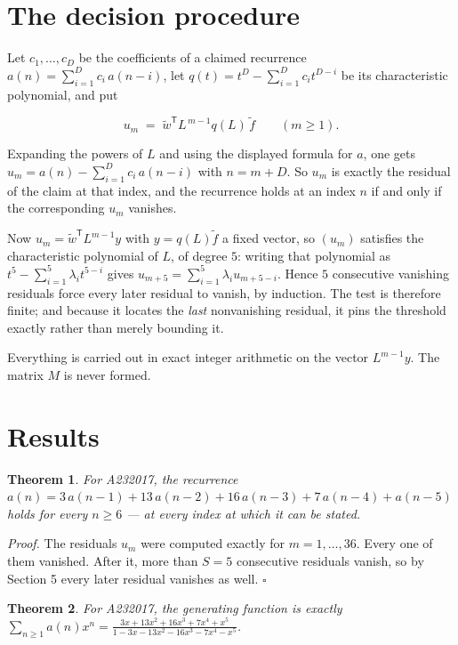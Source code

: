 \documentclass[11pt]{article}
\newtheorem{theorem}{Theorem}
\theoremstyle{definition}
\begin{document}
\section{The decision procedure}

Let $c_1,\dots,c_D$ be the coefficients of a claimed recurrence $a(n) = \sum_{i=1}^{D} c_i\,a(n-i)$, let $q(t) = t^{D} - \sum_{i=1}^{D} c_i t^{D-i}$ be its characteristic polynomial, and put

\[u_m \;=\; \tilde w^{\mathsf T} L^{\,m-1} q(L)\,\tilde f \qquad (m \ge 1).\]

Expanding the powers of $L$ and using the displayed formula for $a$, one gets $u_m = a(n) - \sum_{i=1}^{D} c_i\,a(n-i)$ with $n = m + D$. So $u_m$ is exactly the residual of the claim at that index, and the recurrence holds at an index $n$ if and only if the corresponding $u_m$ vanishes.

Now $u_m = \tilde w^{\mathsf T} L^{m-1} y$ with $y = q(L)\tilde f$ a fixed vector, so $(u_m)$ satisfies the characteristic polynomial of $L$, of degree $5$: writing that polynomial as $t^{5} - \sum_{i=1}^{5} \lambda_i t^{5-i}$ gives $u_{m+5} = \sum_{i=1}^{5} \lambda_i u_{m+5-i}$. Hence $5$ consecutive vanishing residuals force every later residual to vanish, by induction. The test is therefore finite; and because it locates the {\itshape last} nonvanishing residual, it pins the threshold exactly rather than merely bounding it.

Everything is carried out in exact integer arithmetic on the vector $L^{m-1}y$. The matrix $M$ is never formed.

\section{Results}

\begin{theorem} For A232017, the recurrence $a(n) = 3\,a(n-1) + 13\,a(n-2) + 16\,a(n-3) + 7\,a(n-4) + a(n-5)$ holds for every $n \ge 6$ --- at every index at which it can be stated.\end{theorem}

{\itshape Proof.} The residuals $u_m$ were computed exactly for $m = 1,\dots,36$. Every one of them vanished. After it, more than $S = 5$ consecutive residuals vanish, so by Section 5 every later residual vanishes as well. $\square$

\begin{theorem} For A232017, the generating function is exactly $\sum_{n\ge 1} a(n)x^n = \frac{3x + 13x^{2} + 16x^{3} + 7x^{4} + x^{5}}{1 - 3x - 13x^{2} - 16x^{3} - 7x^{4} - x^{5}}$.\end{theorem}
\end{document}
